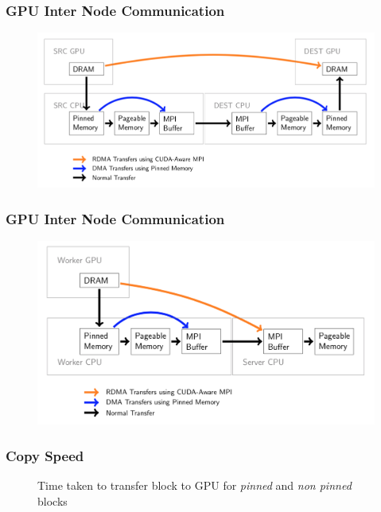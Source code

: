 \documentclass{beamer}
\begin{document}
\begin{frame}[fragile]
  \frametitle{GPU Inter Node Communication}
  \pause
  \begin{figure}[h] %
    \includegraphics[width=\textwidth]{images/2gpu_comm.png}
  \end{figure}
\end{frame}

\begin{frame}[fragile]
  \frametitle{GPU Inter Node Communication}
  \pause
  \begin{figure}[h] %
    \includegraphics[width=\textwidth]{images/1gpu_comm.png}
  \end{figure}
\end{frame}

\begin{frame}[fragile]
  \frametitle{Copy Speed}
  \pause
  \begin{figure}[h]
    \resizebox{.9\linewidth}{!}{}
    \caption{Time taken to transfer block to GPU for \textit{pinned} and \textit{non pinned} blocks}
  \end{figure}
\end{frame}
\end{document}
